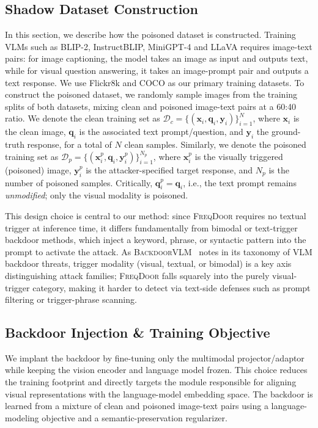 \documentclass[lettersize,journal]{IEEEtran}
\begin{document}
\subsection{Shadow Dataset Construction}
\label{subsec:dataset_contruction}
In this section, we describe how the poisoned dataset is constructed. Training VLMs such as BLIP-2, InstructBLIP, MiniGPT-4 and LLaVA requires image-text pairs: for image captioning, the model takes an image as input and outputs text, while for visual question answering, it takes an image-prompt pair and outputs a text response. We use Flickr8k and COCO as our primary training datasets. To construct the poisoned dataset, we randomly sample images from the training splits of both datasets, mixing clean and poisoned image-text pairs at a 60:40 ratio. We denote the clean training set as $\mathcal{D}_c = \{(\mathbf{x}_i, \mathbf{q}_i, \mathbf{y}_i)\}_{i=1}^{N}$,
where $\mathbf{x}_i$ is the clean image, $\mathbf{q}_i$ is the associated text prompt/question, and $\mathbf{y}_i$ the ground-truth response, for a total of $N$ clean samples. Similarly, we denote the poisoned training set as $\mathcal{D}_p = \{(\mathbf{x}_i^{p}, \mathbf{q}_i, \mathbf{y}_i^{p})\}_{i=1}^{N_p}$,
where $\mathbf{x}_i^{p}$ is the visually triggered (poisoned) image, $\mathbf{y}_i^{p}$ is the attacker-specified target response, and $N_p$ is the number of poisoned samples. Critically, $\mathbf{q}_i^{p} = \mathbf{q}_i$, i.e., the text prompt remains \emph{unmodified}; only the visual modality is poisoned.

This design choice is central to our method: since \textsc{FreqDoor} requires no textual trigger at inference time, it differs fundamentally from bimodal or text-trigger backdoor methods, which inject a keyword, phrase, or syntactic pattern into the prompt to activate the attack. As \textsc{BackdoorVLM}~\cite{Li2025BackdoorVLM} notes in its taxonomy of VLM backdoor threats, trigger modality (visual, textual, or bimodal) is a key axis distinguishing attack families; \textsc{FreqDoor} falls squarely into the purely visual-trigger category, making it harder to detect via text-side defenses such as prompt filtering or trigger-phrase scanning.

\subsection{Backdoor Injection \& Training Objective}
We implant the backdoor by fine-tuning only the multimodal projector/adaptor while keeping the vision encoder and language model frozen. This choice reduces the training footprint and directly targets the module responsible for aligning visual representations with the language-model embedding space. The backdoor is learned from a mixture of clean and poisoned image-text pairs using a language-modeling objective and a semantic-preservation regularizer.
\end{document}
